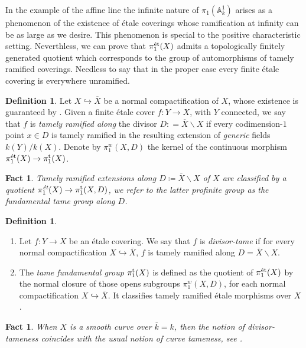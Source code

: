 \documentclass[10pt,a4paper]{amsart}
\numberwithin{equation}{subsection}
\theoremstyle{plain}
\newtheorem{fact}[theorem]{Fact}
\theoremstyle{definition}
\newtheorem{defi}[theorem]{Definition}
\theoremstyle{remark}
\numberwithin{equation}{section}
\begin{document}
In the example of the affine line the infinite nature of $\pi_1(\mathbb A^1_k )$ arises as a phenomenon of the existence of \'etale coverings whose ramification at infinity can be as large as we desire. This phenomenon is special to the positive characteristic
setting.
Neverthless, we can prove that $\pi_1^{\text{\'et}}(X)$ admits a topologically finitely generated quotient which corresponds to the group of automorphisms of tamely ramified coverings. Needless to say that in the proper case every finite \'etale covering is everywhere
unramified.

\begin{defi}
Let $X \hookrightarrow \overline{X}$ be a normal compactification of $X$, whose existence is guaranteed by \cite{nagata}. Given a finite \'etale cover $f \colon Y \to X$, with $Y$ connected,
we say that $f$ is \emph{tamely ramified along} the divisor $D : = \overline{X} \backslash X$ if every codimension-$1$ point $x \in D$ is
tamely ramified in the resulting extension of \emph{generic} fields $k(Y) / k(X)$. Denote by $\pi_1^w(X, D)$
the kernel of the continuous morphism $ \pi_1^{\text{\'et}}(X) \to \pi_1^{\mathrm{t}}(X)$.
\end{defi}

\begin{fact}
Tamely ramified extensions along $D \coloneqq \overline{X} \backslash X$ of $X$ are classified by a quotient $\pi_1^{\emph{\text{\'et}}}(X) \to \pi_1^{\mathrm{t}}(X, D)$, we refer to the latter profinite group as the \emph{fundamental tame group along $D$}.
\end{fact}


\begin{defi} \label{}
\begin{enumerate}
\item Let $f \colon Y \to X$ be an \'etale covering. We say that $f$ is \emph{divisor-tame} if for every normal compactification
$X \hookrightarrow \overline{X}$, $f$ is tamely ramified along $D = \overline{X} \backslash X$.
\item The \emph{tame fundamental group} $\pi_1^{\mathrm{t}}(X)$ is defined as the quotient of $\pi_1^{\text{\'et}}(X)$ by the normal closure of
those opens subgroups $\pi_1^w(X, D)$, for each normal compactification $X \hookrightarrow \overline{X}$. It classifies tamely ramified \'etale morphisms over $X$.
\end{enumerate}
\end{defi}

\begin{fact}
When $X$ is a smooth curve over $\overline{k} = k$, then the notion of divisor-tameness coincides with the usual notion of curve tameness, see \cite[Appendix 1]{cadoret}.
\end{fact}
\end{document}

